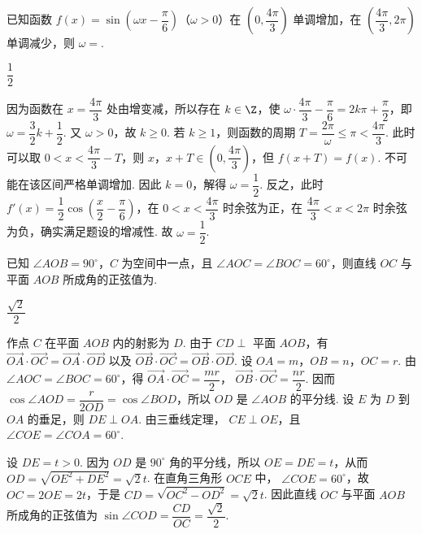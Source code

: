 \begin{problem}
已知函数 \(f(x)=\sin\!\left(\omega x-\dfrac{\pi}{6}\right)\)（\(\omega>0\)）在 \(\left(0,\dfrac{4\pi}{3}\right)\) 单调增加，在 \(\left(\dfrac{4\pi}{3},2\pi\right)\) 单调减少，则 \(\omega=\)\fillinblank{}.
\end{problem}

\begin{answer}
\(\dfrac12\)
\end{answer}

\begin{solution}
因为函数在 \(x=\dfrac{4\pi}{3}\) 处由增变减，所以存在 \(k\in\Z\)，使
\(\omega\cdot\dfrac{4\pi}{3}-\dfrac{\pi}{6}=2k\pi+\dfrac{\pi}{2}\)，即 \(\omega=\dfrac32k+\dfrac12\).
又 \(\omega>0\)，故 \(k\ge0\). 若 \(k\ge1\)，则函数的周期
\(T=\dfrac{2\pi}{\omega}\le\pi<\dfrac{4\pi}{3}\). 此时可以取
\(0<x<\dfrac{4\pi}{3}-T\)，则 \(x\)，\(x+T\in\left(0,\dfrac{4\pi}{3}\right)\)，但
\(f(x+T)=f(x)\). 不可能在该区间严格单调增加. 因此 \(k=0\)，解得
\(\omega=\dfrac12\). 反之，此时 \(f'(x)=\dfrac12\cos\left(\dfrac{x}{2}-\dfrac{\pi}{6}\right)\)，在 \(0<x<\dfrac{4\pi}{3}\) 时余弦为正，在 \(\dfrac{4\pi}{3}<x<2\pi\) 时余弦为负，确实满足题设的增减性. 故 \(\omega=\dfrac12\).
\end{solution}

\begin{problem}
已知 \(\angle AOB=90^\circ\)，\(C\) 为空间中一点，且 \(\angle AOC=\angle BOC=60^\circ\)，则直线 \(OC\) 与平面 \(AOB\) 所成角的正弦值为\fillinblank{}.
\end{problem}

\begin{answer}
\(\dfrac{\sqrt2}{2}\)
\end{answer}

\begin{solution}
作点 \(C\) 在平面 \(AOB\) 内的射影为 \(D\). 由于 \(CD\perp\) 平面 \(AOB\)，有
\(\overrightarrow{OA}\cdot\overrightarrow{OC}=\overrightarrow{OA}\cdot\overrightarrow{OD}\) 以及
\(\overrightarrow{OB}\cdot\overrightarrow{OC}=\overrightarrow{OB}\cdot\overrightarrow{OD}\).
设 \(OA=m\)，\(OB=n\)，\(OC=r\). 由
\(\angle AOC=\angle BOC=60^\circ\)，得
\(\overrightarrow{OA}\cdot\overrightarrow{OC}=\dfrac{mr}{2}\)，
\(\overrightarrow{OB}\cdot\overrightarrow{OC}=\dfrac{nr}{2}\). 因而
\(\cos\angle AOD=\dfrac{r}{2OD}=\cos\angle BOD\)，所以 \(OD\) 是
\(\angle AOB\) 的平分线.
设 \(E\) 为 \(D\) 到 \(OA\) 的垂足，则 \(DE\perp OA\). 由三垂线定理，
\(CE\perp OE\)，且 \(\angle COE=\angle COA=60^\circ\).


设 \(DE=t>0\). 因为 \(OD\) 是 \(90^\circ\) 角的平分线，所以 \(OE=DE=t\)，从而
\(OD=\sqrt{OE^2+DE^2}=\sqrt2t\). 在直角三角形 \(OCE\) 中，
\(\angle COE=60^\circ\)，故 \(OC=2OE=2t\)，于是
\(CD=\sqrt{OC^2-OD^2}=\sqrt2t\).
因此直线 \(OC\) 与平面 \(AOB\) 所成角的正弦值为
\(\sin\angle COD=\dfrac{CD}{OC}=\dfrac{\sqrt2}{2}\).
\end{solution}

